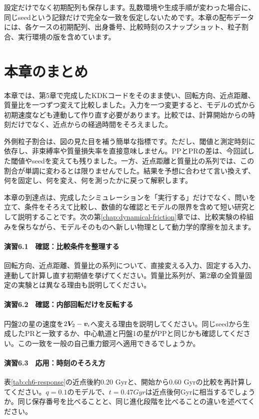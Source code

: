 設定だけでなく初期配列も保存します。乱数環境や生成手順が変わった場合に、同じseedという記録だけで完全な一致を仮定しないためです。本章の配布データには、各ケースの初期配列、出身番号、比較時刻のスナップショット、粒子割合、実行環境の版を含めています。

\section{本章のまとめ}
\label{sec:ch6-summary}
本章では、第5章で完成したKDKコードをそのまま使い、回転方向、近点距離、質量比を一つずつ変えて比較しました。入力を一つ変更すると、モデルの式から初期速度なども連動して作り直す必要があります。比較では、計算開始からの時刻だけでなく、近点からの経過時間をそろえました。

外側粒子割合は、図の見た目を補う簡単な指標です。ただし、閾値と測定時刻に依存し、非束縛率や質量損失率を直接意味しません。PPとPRの差は、今回試した閾値やseedを変えても残りました。一方、近点距離と質量比の系列では、この割合が単調に変わるとは限りませんでした。結果を予想に合わせて言い換えず、何を固定し、何を変え、何を測ったかに戻って解釈します。

本章の到達点は、完成したシミュレーションを「実行する」だけでなく、問いを立て、条件をそろえて比較し、数値的な確認とモデルの限界を含めて短い研究として説明することです。次の第\ref{chap:dynamical-friction}章では、比較実験の枠組みを保ちながら、モデルそのものへ新しい物理として動力学的摩擦を加えます。

\chapterexercises
\paragraph{演習6.1　確認：比較条件を整理する}
回転方向、近点距離、質量比の系列について、直接変える入力、固定する入力、連動して計算し直す初期値を挙げてください。質量比系列が、第2章の全質量固定の実験とは異なる理由も説明してください。

\paragraph{演習6.2　確認：内部回転だけを反転する}
円盤2の星の速度を$2\boldsymbol V_2-\boldsymbol v_i$へ変える理由を説明してください。同じseedから生成したPRと一致するか、中心軌道と円盤1の星がPPと同じかも確認してください。この一致を一般の自己重力銀河へ適用できるでしょうか。

\paragraph{演習6.3　応用：時刻のそろえ方}
表\ref{tab:ch6-response}の近点後約0.20 Gyrと、開始から0.60 Gyrの比較を再計算してください。$q=0.1$のモデルで、$t=0.47\unit{Gyr}$は近点後何Gyrに相当するでしょうか。同じ保存番号を比べることと、同じ進化段階を比べることの違いを述べてください。

